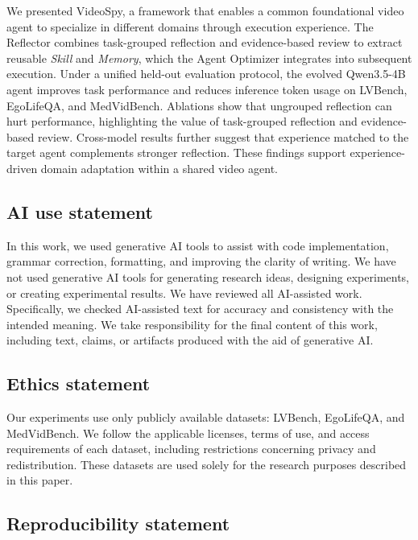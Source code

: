 \documentclass{article} %
\begin{document}
We presented VideoSpy, a framework that enables a common foundational video agent to specialize in different domains through execution experience. The Reflector combines task-grouped reflection and evidence-based review to extract reusable \textit{Skill} and \textit{Memory}, which the Agent Optimizer integrates into subsequent execution. Under a unified held-out evaluation protocol, the evolved Qwen3.5-4B agent improves task performance and reduces inference token usage on LVBench, EgoLifeQA, and MedVidBench. Ablations show that ungrouped reflection can hurt performance, highlighting the value of task-grouped reflection and evidence-based review. Cross-model results further suggest that experience matched to the target agent complements stronger reflection. These findings support experience-driven domain adaptation within a shared video agent.

\clearpage
\subsection*{AI use statement}

In this work, we used generative AI tools to assist with code implementation, grammar correction, formatting, and improving the clarity of writing.
We have not used generative AI tools for generating research ideas, designing experiments, or creating experimental results.
We have reviewed all AI-assisted work. Specifically, we checked AI-assisted text for accuracy and consistency with the intended meaning.
We take responsibility for the final content of this work, including text, claims, or artifacts produced with the aid of generative AI.

\subsection*{Ethics statement}

Our experiments use only publicly available datasets: LVBench, EgoLifeQA, and MedVidBench.
We follow the applicable licenses, terms of use, and access requirements of each dataset, including restrictions concerning privacy and redistribution.
These datasets are used solely for the research purposes described in this paper.

\subsection*{Reproducibility statement}
\end{document}
